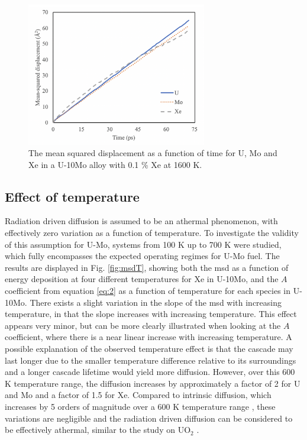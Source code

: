 \documentclass[review]{elsarticle}
\begin{document}
\begin{figure}[h]
 \centering
 \includegraphics[width=0.7\textwidth]{5_liq_diff.png} 
 \caption{The mean squared displacement as a function of time for U, Mo and Xe in a U-10Mo alloy with 0.1 \% Xe at 1600 K. }
 \label{fig:liq_diff}
\end{figure}

\FloatBarrier

\subsection{Effect of temperature}

Radiation driven diffusion is assumed to be an athermal phenomenon, with effectively zero variation as a function of temperature. To investigate the validity of this assumption for U-Mo, systems from 100 K up to 700 K were studied, which fully encompasses the expected operating regimes for U-Mo fuel. The results are displayed in Fig. \ref{fig:msdT}, showing both the msd as a function of energy deposition at four different temperatures for Xe in U-10Mo, and the $A$ coefficient from equation \ref{eq:2} as a function of temperature for each species in U-10Mo. There exists a slight variation in the slope of the msd with increasing temperature, in that the slope increases with increasing temperature. This effect appears very minor, but can be more clearly illustrated when looking at the $A$ coefficient, where there is a near linear increase with increasing temperature. A possible explanation of the observed temperature effect is that the cascade may last longer due to the smaller temperature difference relative to its surroundings and a longer cascade lifetime would yield more diffusion. However, over this 600 K temperature range, the diffusion increases by approximately a factor of 2 for U and Mo and a factor of 1.5 for Xe. Compared to intrinsic diffusion, which increases by 5 orders of magnitude over a 600 K temperature range \cite{huang2013}, these variations are negligible and the radiation driven diffusion can be considered to be effectively athermal, similar to the study on UO$_2$ \cite{cooper2016}. 
\end{document}
